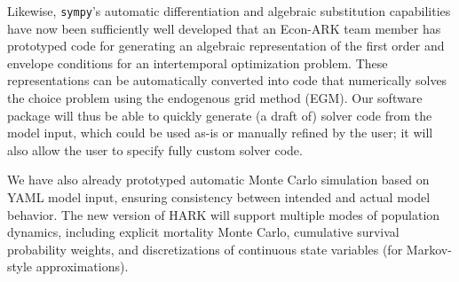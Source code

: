 \documentclass[12pt,pdftex,letterpaper]{article}
\begin{document}
Likewise, \texttt{sympy}'s automatic differentiation and algebraic substitution capabilities have now been sufficiently well developed that an Econ-ARK team member has prototyped code for generating an algebraic representation of the first order and envelope conditions for an intertemporal optimization problem. These representations can be automatically converted into code that numerically solves the choice problem using the endogenous grid method (EGM). Our software package will thus be able to quickly generate (a draft of) solver code from the model input, which could be used as-is or manually refined by the user; it will also allow the user to specify fully custom solver code.

We have also already prototyped automatic Monte Carlo simulation based on YAML model input, ensuring consistency between intended and actual model behavior. The new version of HARK will support multiple modes of population dynamics, including explicit mortality Monte Carlo, cumulative survival probability weights, and discretizations of continuous state variables (for Markov-style approximations).
\end{document}
